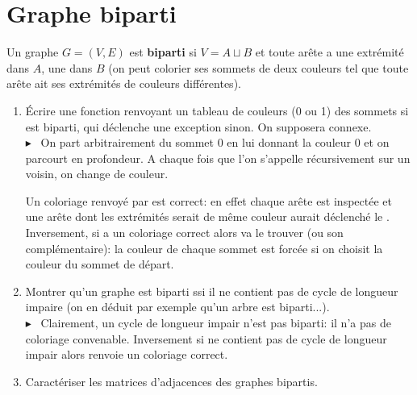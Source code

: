 \documentclass[mp2i]{exam}
\begin{document}
	\section{Graphe biparti}
	Un graphe $G = (V, E)$ est \textbf{biparti} si $V = A \sqcup B$ et toute arête a une extrémité dans $A$, une dans $B$ (on peut colorier ses sommets de deux couleurs tel que toute arête ait ses extrémités de couleurs différentes).
	\begin{enumerate}
		\item Écrire une fonction  renvoyant un tableau de couleurs (0 ou 1) des sommets si  est biparti, qui déclenche une exception sinon. On supposera  connexe. 
		\if{}
		\\$\blacktriangleright$ ~On part arbitrairement du sommet 0 en lui donnant la couleur 0 et on parcourt  en profondeur. A chaque fois que l'on s'appelle récursivement sur un voisin, on change de couleur. 
		\begin{center}
		\end{center}
		Un coloriage renvoyé par  est correct: en effet chaque arête est inspectée et une arête dont les extrémités serait de même couleur aurait déclenché le .\\
		Inversement, si  a un coloriage correct alors  va le trouver (ou son complémentaire): la couleur de chaque sommet est forcée si on choisit la couleur du sommet de départ.
		\fi
		\item Montrer qu'un graphe est biparti ssi il ne contient pas de cycle de longueur impaire (on en déduit par exemple qu'un arbre est biparti...).
		\if{}
		\\$\blacktriangleright$ ~Clairement, un cycle de longueur impair n'est pas biparti: il n'a pas de coloriage convenable. Inversement si  ne contient pas de cycle de longueur impair alors  renvoie un coloriage correct.
		\fi
		\item Caractériser les matrices d'adjacences des graphes bipartis.

\end{enumerate}
\end{document}
